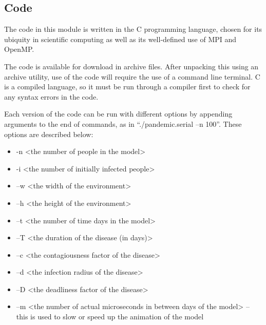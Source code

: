 \documentclass[letterpaper,10pt,openany,oneside]{sphinxmanual}
\begin{document}
\subsection{Code}
\label{0-Introduction/introduction:code}
The code in this module is written in the C programming language, chosen
for its ubiquity in scientific computing as well as its well-defined use
of MPI and OpenMP.

The code is available for download in archive files. After unpacking
this using an archive utility, use of the code will require the use of a
command line terminal. C is a compiled language, so it must be run
through a compiler first to check for any syntax errors in the code.

Each version of
the code can be run with different options by appending arguments to the
end of commands, as in “./pandemic.serial –n 100”. These options are
described below:
\begin{itemize}
\item {} 
-n \textless{}the number of people in the model\textgreater{}

\item {} 
-i \textless{}the number of initially infected people\textgreater{}

\item {} 
–w \textless{}the width of the environment\textgreater{}

\item {} 
–h \textless{}the height of the environment\textgreater{}

\item {} 
–t \textless{}the number of time days in the model\textgreater{}

\item {} 
–T \textless{}the duration of the disease (in days)\textgreater{}

\item {} 
–c \textless{}the contagiousness factor of the disease\textgreater{}

\item {} 
–d \textless{}the infection radius of the disease\textgreater{}

\item {} 
–D \textless{}the deadliness factor of the disease\textgreater{}

\item {} 
–m \textless{}the number of actual microseconds in between days of the model\textgreater{} – this is used to slow or speed up the animation of the model

\end{itemize}
\end{document}
